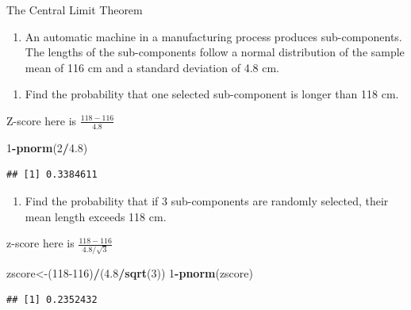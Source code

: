 \documentclass[
  openany]{book}
\newenvironment{Shaded}{\begin{snugshade}}{\end{snugshade}}
\newcommand{\DecValTok}[1]{\textcolor[rgb]{0.00,0.00,0.81}{#1}}
\newcommand{\FloatTok}[1]{\textcolor[rgb]{0.00,0.00,0.81}{#1}}
\newcommand{\FunctionTok}[1]{\textcolor[rgb]{0.13,0.29,0.53}{\textbf{#1}}}
\newcommand{\NormalTok}[1]{#1}
\newcommand{\OtherTok}[1]{\textcolor[rgb]{0.56,0.35,0.01}{#1}}
\newcommand{\SpecialCharTok}[1]{\textcolor[rgb]{0.81,0.36,0.00}{\textbf{#1}}}
\providecommand{\tightlist}{%
  \setlength{\itemsep}{0pt}\setlength{\parskip}{0pt}}
\begin{document}
The Central Limit Theorem

\begin{enumerate}
\def\labelenumi{\arabic{enumi}.}
\setcounter{enumi}{1}
\tightlist
\item
  An automatic machine in a manufacturing process produces sub-components. The lengths of the sub-components follow a normal distribution of the sample mean of 116 cm and a standard deviation of 4.8 cm.
\end{enumerate}

\begin{enumerate}
\def\labelenumi{\alph{enumi}.}
\tightlist
\item
  Find the probability that one selected sub-component is longer than 118 cm.
\end{enumerate}

Z-score here is \(\frac{118-116}{4.8}\)

\begin{Shaded}
\begin{Highlighting}[]
\DecValTok{1}\SpecialCharTok{{-}}\FunctionTok{pnorm}\NormalTok{(}\DecValTok{2}\SpecialCharTok{/}\FloatTok{4.8}\NormalTok{)}
\end{Highlighting}
\end{Shaded}

\begin{verbatim}
## [1] 0.3384611
\end{verbatim}

\begin{enumerate}
\def\labelenumi{\alph{enumi}.}
\setcounter{enumi}{1}
\tightlist
\item
  Find the probability that if 3 sub-components are randomly selected, their mean length exceeds 118 cm.
\end{enumerate}

z-score here is \(\frac{118-116}{4.8/\sqrt{3}}\)

\begin{Shaded}
\begin{Highlighting}[]
\NormalTok{zscore}\OtherTok{\textless{}{-}}\NormalTok{(}\DecValTok{118{-}116}\NormalTok{)}\SpecialCharTok{/}\NormalTok{(}\FloatTok{4.8}\SpecialCharTok{/}\FunctionTok{sqrt}\NormalTok{(}\DecValTok{3}\NormalTok{))}
\DecValTok{1}\SpecialCharTok{{-}}\FunctionTok{pnorm}\NormalTok{(zscore)}
\end{Highlighting}
\end{Shaded}

\begin{verbatim}
## [1] 0.2352432
\end{verbatim}
\end{document}
